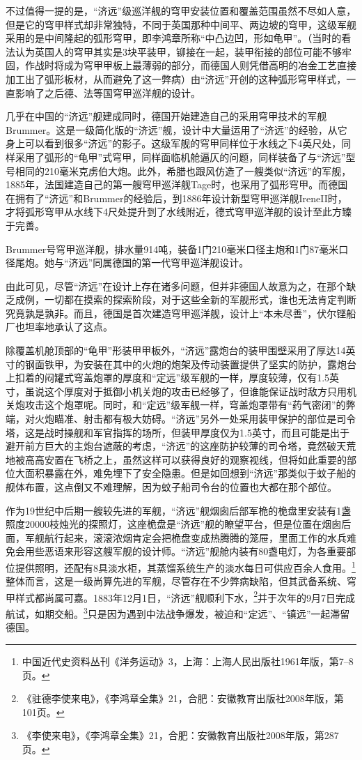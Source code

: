 \documentclass[12pt,UTF8]{ctexbook}
\begin{document}
不过值得一提的是，“济远”级巡洋舰的穹甲安装位置和覆盖范围虽然不尽如人意，但是它的穹甲样式却非常独特，不同于英国那种中间平、两边坡的穹甲，这级军舰采用的是中间隆起的弧形穹甲，即李鸿章所称“中凸边凹，形如龟甲”。（当时的看法认为英国人的穹甲其实是3块平装甲，铆接在一起，装甲衔接的部位可能不够牢固，作战时将成为穹甲甲板上最薄弱的部分，而德国人则凭借高明的冶金工艺直接加工出了弧形板材，从而避免了这一弊病）由“济远”开创的这种弧形穹甲样式，一直影响了之后德、法等国穹甲巡洋舰的设计。

几乎在中国的“济远”舰建成同时，德国开始建造自己的采用穹甲技术的军舰Brummer。这是一级简化版的“济远”舰，设计中大量运用了“济远”的经验，从它身上可以看到很多“济远”的影子。这级军舰的穹甲同样位于水线之下4英尺处，同样采用了弧形的“龟甲”式穹甲，同样面临机舱逼仄的问题，同样装备了与“济远”型号相同的210毫米克虏伯大炮。此外，希腊也跟风仿造了一艘类似“济远”的军舰，1885年，法国建造自己的第一艘穹甲巡洋舰Tage时，也采用了弧形穹甲。而德国在拥有了“济远”和Brummer的经验后，到1886年设计新型穹甲巡洋舰IreneII时，才将弧形穹甲从水线下4尺处提升到了水线附近，德式穹甲巡洋舰的设计至此方臻于完善。

Brummer号穹甲巡洋舰，排水量914吨，装备1门210毫米口径主炮和1门87毫米口径尾炮。她与“济远”同属德国的第一代穹甲巡洋舰设计。

由此可见，尽管“济远”在设计上存在诸多问题，但并非德国人故意为之，在那个缺乏成例，一切都在摸索的探索阶段，对于这些全新的军舰形式，谁也无法肯定判断究竟孰是孰非。而且，德国是首次建造穹甲巡洋舰，设计上“本未尽善”，伏尔铿船厂也坦率地承认了这点。

除覆盖机舱顶部的“龟甲”形装甲甲板外，“济远”露炮台的装甲围壁采用了厚达14英寸的钢面铁甲，为安装在其中的火炮的炮架及传动装置提供了坚实的防护，露炮台上扣着的闷罐式穹盖炮罩的厚度和“定远”级军舰的一样，厚度较薄，仅有1.5英寸，虽说这个厚度对于抵御小机关炮的攻击已经够了，但谁能保证战时敌方只用机关炮攻击这个炮罩呢。同时，和“定远”级军舰一样，穹盖炮罩带有“药气密闭”的弊端，对火炮瞄准、射击都有极大妨碍。“济远”另外一处采用装甲保护的部位是司令塔，这是战时操舰和军官指挥的场所，但装甲厚度仅为1.5英寸，而且可能是出于避开前方巨大的主炮台遮蔽的考虑，“济远”的这座防护较薄的司令塔，竟然破天荒地被高高安置在飞桥之上，虽然这样可以获得良好的观察视线，但将如此重要的部位大面积暴露在外，难免埋下了安全隐患。但是如回想到“济远”那类似于蚊子船的舰体布置，这点倒又不难理解，因为蚊子船司令台的位置也大都在那个部位。

作为19世纪中后期一艘较先进的军舰，“济远”舰烟囱后部军桅的桅盘里安装有1盏照度20000枝烛光的探照灯，这座桅盘是“济远”舰的瞭望平台，但是位置在烟囱后面，军舰航行起来，滚滚浓烟肯定会把桅盘变成热腾腾的笼屉，里面工作的水兵难免会用些恶语来形容这艘军舰的设计师。“济远”舰舱内装有80盏电灯，为各重要部位提供照明，还配有8具淡水柜，其蒸馏系统生产的淡水每日可供应百余人食用。\footnote{中国近代史资料丛刊《洋务运动》3，上海：上海人民出版社1961年版，第7--8页。}整体而言，这是一级尚算先进的军舰，尽管存在不少弊病缺陷，但其武备系统、穹甲样式都尚属可嘉。1883年12月1日，“济远”舰顺利下水，\footnote{《驻德李使来电》，《李鸿章全集》21，合肥：安徽教育出版社2008年版，第101页。}并于次年的9月7日完成航试，如期交船。\footnote{《李使来电》，《李鸿章全集》21，合肥：安徽教育出版社2008年版，第287页。}只是因为遇到中法战争爆发，被迫和“定远”、“镇远”一起滞留德国。
\end{document}

